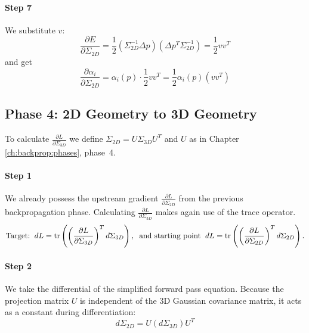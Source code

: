 \paragraph{Step 7} We substitute $v$: 
$$
\frac{\partial E}{\partial \Sigma_{2D}} =
\frac{1}{2} \left( \Sigma_{2D}^{-1} \Delta p \right) \left( \Delta p^T \Sigma_{2D}^{-1} \right) =
\frac{1}{2} v v^T
$$
and get
$$
\frac{\partial \alpha_i}{\partial \Sigma_{2D}} = 
\alpha_i(p) \cdot \frac{1}{2} v v^T =
\frac{1}{2} \alpha_i(p) \left( v v^T \right)
$$

\subsection{Phase 4: 2D Geometry to 3D Geometry}
\label{ax:ph4}
To calculate $\frac{\partial L}{\partial \Sigma_{3D}}$ we define $\Sigma_{2D} = U \Sigma_{3D} U^T$ and $U$ as in Chapter \ref{ch:backprop:phases}, phase~4.

\paragraph{Step 1} We already possess the upstream gradient $\frac{\partial L}{\partial \Sigma_{2D}}$ from the previous backpropagation phase. Calculating $\frac{\partial L}{\partial \Sigma_{3D}}$ makes again use of the trace operator.
$$
\text{Target:}\hspace{2mm}
dL = \text{tr}\left( \left(\frac{\partial L}{\partial \Sigma_{3D}}\right)^T d\Sigma_{3D} \right), 
\hspace{2mm}\text{and starting point}\hspace{2mm}
dL = \text{tr}\left( \left(\frac{\partial L}{\partial \Sigma_{2D}}\right)^T d\Sigma_{2D} \right).
$$

\paragraph{Step 2} We take the differential of the simplified forward pass equation. Because the projection matrix $U$ is independent of the 3D Gaussian covariance matrix, it acts as a constant during differentiation:$$d\Sigma_{2D} = U (d\Sigma_{3D}) U^T$$

